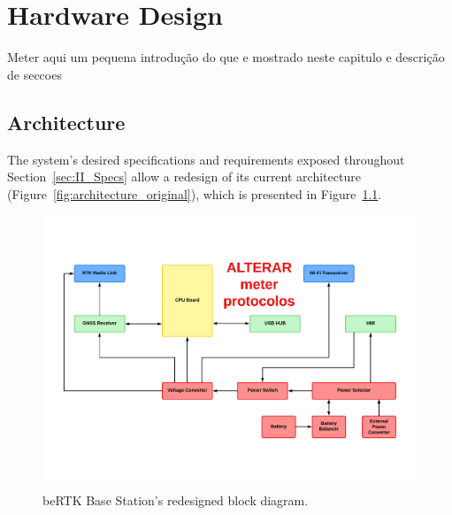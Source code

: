 

\chapter{Hardware Design}\label{cha:chapter3_HardwareDesign}

Meter aqui um pequena introdução do que e mostrado neste capitulo e descrição de seccoes

\section{Architecture}\label{31_Architecture}

The system's desired specifications and requirements exposed throughout Section~\ref{sec:II_Specs} allow a redesign of its current architecture (Figure~\ref{fig:architecture_original}), which is presented in Figure~\ref{fig:architecture_new}.

\begin{figure}[h]
	\centering
	\includegraphics[width=1.0\textwidth]{Chapters/Figures/new_architecture.pdf}
	\caption{beRTK\textsuperscript{\textregistered} Base Station's redesigned block diagram.}
	\label{fig:architecture_new}
\end{figure}

